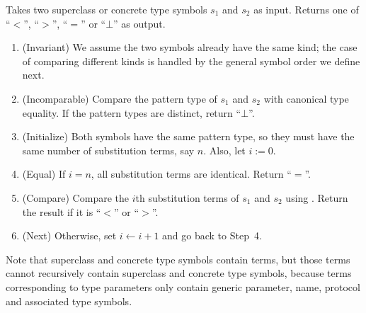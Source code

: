 \documentclass[../generics]{subfiles}
\begin{document}
\begin{algorithm}\label{concrete reduction order}
Takes two superclass or concrete type symbols $s_1$ and $s_2$ as input. Returns one of ``$<$'', ``$>$'', ``$=$'' or \index{$\bot$}``$\bot$'' as output.
\begin{enumerate}
\item (Invariant) We assume the two symbols already have the same kind; the case of comparing different kinds is handled by the general symbol order we define next.
\item (Incomparable) Compare the pattern type of $s_1$ and $s_2$ with canonical type equality. If the pattern types are distinct, return ``$\bot$''.
\item (Initialize) Both symbols have the same pattern type, so they must have the same number of substitution terms, say $n$. Also, let $i:=0$.
\item (Equal) If $i=n$, all substitution terms are identical. Return ``$=$''.
\item (Compare) Compare the $i$th substitution terms of $s_1$ and $s_2$ using . Return the result if it is ``$<$'' or ``$>$''.
\item (Next) Otherwise, set $i\leftarrow i+1$ and go back to Step~4.
\end{enumerate}
\end{algorithm}

Note that superclass and concrete type symbols contain terms, but those terms cannot recursively contain superclass and concrete type symbols, because terms corresponding to type parameters only contain generic parameter, name, protocol and associated type symbols.
\end{document}
